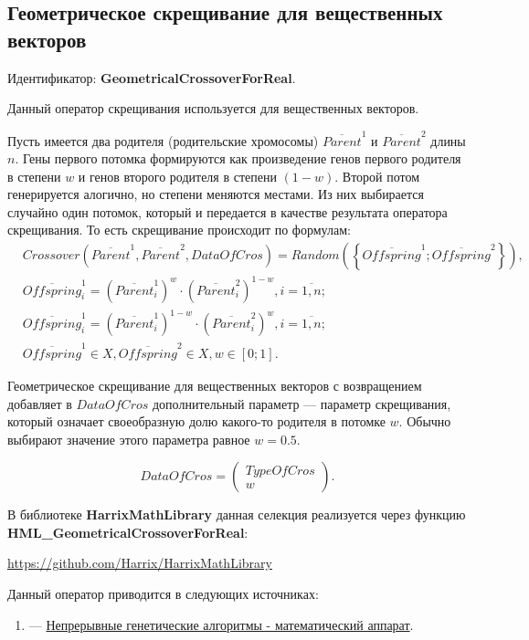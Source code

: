 \subsection{Геометрическое скрещивание для вещественных векторов}\label{SetOfOperatorsAlgorithms:GeometricalCrossoverForReal}

Идентификатор: \textbf{GeometricalCrossoverForReal}.

Данный оператор скрещивания используется для вещественных векторов.

Пусть имеется два родителя (родительские хромосомы) $ \overline{Parent}^1 $ и $ \overline{Parent}^2$ длины $n$. Гены первого потомка формируются как произведение генов первого родителя в степени $w$ и генов второго родителя в степени $\left( 1-w\right) $. Второй потом генерируется алогично, но степени меняются местами.  Из них выбирается случайно один потомок, который и передается в качестве результата оператора скрещивания. То есть скрещивание происходит по формулам:
\begin{align}
\label{SetOfOperatorsAlgorithms:eq:GeometricalCrossoverForReal}
&Crossover \left( \overline{Parent}^1, \overline{Parent}^2, DataOfCros\right)=Random \left(\left\lbrace \overline{Offspring}^1; \overline{Offspring}^2\right\rbrace  \right), \\
& \overline{Offspring}^1_i=\left( \overline{Parent}^1_i\right)^w \cdot\left( \overline{Parent}^2_i\right)^{1-w}  , i=\overline{1,n};\nonumber\\
& \overline{Offspring}^1_i=\left( \overline{Parent}^1_i\right)^{1-w} \cdot\left( \overline{Parent}^2_i\right)^w  , i=\overline{1,n};\nonumber\\
&\overline{Offspring}^1\in X, \overline{Offspring}^2\in X, w\in \left[ 0; 1\right] .\nonumber
\end{align}

Геометрическое скрещивание для вещественных векторов с возвращением добавляет в $ DataOfCros $ дополнительный параметр --- параметр скрещивания, который означает своеобразную долю какого-то родителя в потомке $ w $. Обычно выбирают значение этого параметра равное $ w=0.5 $.

\begin{equation}
DataOfCros=\left( \begin{array}{c} TypeOfCros \\ w \end{array} \right).
\end{equation}

В библиотеке \textbf{HarrixMathLibrary} данная селекция реализуется через функцию \textbf{HML\_GeometricalCrossoverForReal}:

\href{https://github.com/Harrix/HarrixMathLibrary}{https://github.com/Harrix/HarrixMathLibrary}

Данный оператор приводится в следующих источниках:

\begin{enumerate}
\item \cite{web:basegroup.ru:real_coded_ga} ---  \href{http://www.basegroup.ru/library/optimization/real_coded_ga/}{Непрерывные генетические алгоритмы - математический аппарат}.
\end{enumerate}